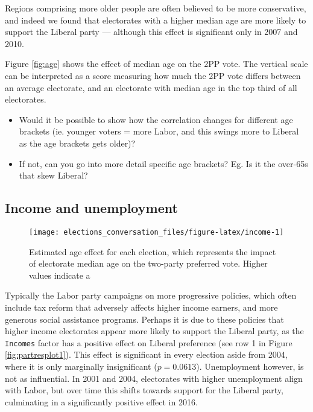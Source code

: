 \documentclass[11pt,a4paper,]{article}
\providecommand{\tightlist}{%
  \setlength{\itemsep}{0pt}\setlength{\parskip}{0pt}}
\begin{document}
Regions comprising more older people are often believed to be more conservative, and indeed we found that electorates with a higher median age are more likely to support the Liberal party --- although this effect is significant only in 2007 and 2010.

Figure \ref{fig:age} shows the effect of median age on the 2PP vote. The vertical scale can be interpreted as a score measuring how much the 2PP vote differs between an average electorate, and an electorate with median age in the top third of all electorates.

\begin{itemize}
\tightlist
\item
  Would it be possible to show how the correlation changes for different age brackets (ie. younger voters = more Labor, and this swings more to Liberal as the age brackets gets older)?
\item
  If not, can you go into more detail specific age brackets? Eg. Is it the over-65s that skew Liberal?
\end{itemize}

\hypertarget{income-and-unemployment}{%
\subsection*{Income and unemployment}\label{income-and-unemployment}}

\begin{figure}[H]

{\centering \texttt{[image: elections\_conversation\_files/figure-latex/income-1]} 

}

\caption{Estimated age effect for each election, which represents the impact of electorate median age on the two-party preferred vote. Higher values indicate a }\label{fig:income}
\end{figure}

Typically the Labor party campaigns on more progressive policies, which often include tax reform that adversely affects higher income earners, and more generous social assistance programs. Perhaps it is due to these policies that higher income electorates appear more likely to support the Liberal party, as the \texttt{Incomes} factor has a positive effect on Liberal preference (see row 1 in Figure \ref{fig:partresplot1}). This effect is significant in every election aside from 2004, where it is only marginally insignificant (\(p = 0.0613\)). Unemployment however, is not as influential. In 2001 and 2004, electorates with higher unemployment align with Labor, but over time this shifts towards support for the Liberal party, culminating in a significantly positive effect in 2016.
\end{document}
